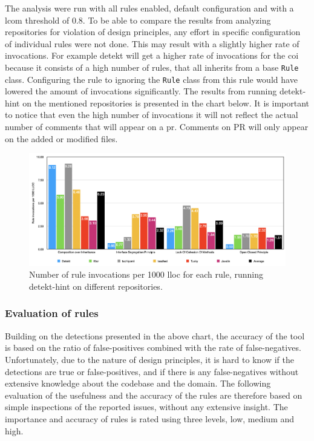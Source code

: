 \documentclass{report}
\begin{document}
The analysis were run with all rules enabled, default configuration and with a \gls{lcom} threshold of 0.8. To be able to compare the results from analyzing repositories for violation of design principles, any effort in specific configuration of individual rules were not done. This may result with a slightly higher rate of invocations. For example detekt will get a higher rate of invocations for the \gls{coi} because it consists of a high number of rules, that all inherits from a base \texttt{Rule} class. Configuring the rule to ignoring the \texttt{Rule} class from this rule would have lowered the amount of invocations significantly. The results from running detekt-hint on the mentioned repositories is presented in the chart below. It is important to notice that even the high number of invocations it will not reflect the actual number of comments that will appear on a \gls{pr}. Comments on PR will only appear on the added or modified files.


\begin{figure}[h!]
    \centering
    \includegraphics[width=\linewidth]{images/distribution.png}
    \caption{Number of rule invocations per 1000 \gls{lloc} for each rule, running detekt-hint on different repositories. }
    \label{fig:distribution}
\end{figure}

\subsubsection{Evaluation of rules}
Building on the detections presented in the above chart, the accuracy of the tool is based on the ratio of false-positives combined with the rate of false-negatives. Unfortunately, due to the nature of design principles, it is hard to know if the detections are true or false-positives, and if there is any false-negatives without extensive knowledge about the codebase and the domain. The following evaluation of the usefulness and the accuracy of the rules are therefore based on simple inspections of the reported issues, without any extensive insight. The importance and accuracy of rules is rated using three levels, low, medium and high.
\end{document}
